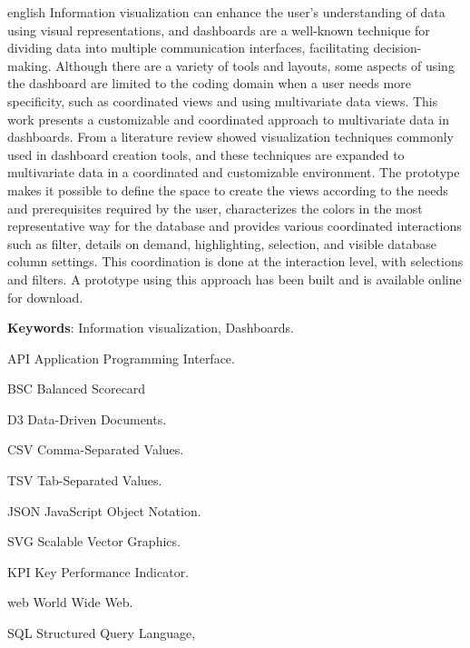 \documentclass[
	12pt,				%
	openright,			%
	oneside,			%
	a4paper,			%
	english,			%
	brazil				%
	]{abntex2}
\newcommand{\listofquadrosname}{Lista de quadros}
\begin{document}
\begin{resumo}[Abstract]
 \begin{otherlanguage*}{english}
   Information visualization can enhance the user's understanding of data using visual representations, and dashboards are a well-known technique for dividing data into multiple communication interfaces, facilitating decision-making. Although there are a variety of tools and layouts, some aspects of using the dashboard are limited to the coding domain when a user needs more specificity, such as coordinated views and using multivariate data views. This work presents a customizable and coordinated approach to multivariate data in dashboards. From a literature review showed visualization techniques commonly used in dashboard creation tools, and these techniques are expanded to multivariate data in a coordinated and customizable environment. The prototype makes it possible to define the space to create the views according to the needs and prerequisites required by the user, characterizes the colors in the most representative way for the database and provides various coordinated interactions such as filter, details on demand, highlighting, selection, and visible database column settings. This coordination is done at the interaction level, with selections and filters. A prototype using this approach has been built and is available online for download.
   \vspace{\onelineskip}
 
   \noindent 
   \textbf{Keywords}: Information visualization, Dashboards.
 \end{otherlanguage*}
\end{resumo}


\listoffigures*
\cleardoublepage

\pdfbookmark[0]{\listofquadrosname}{loq}
\cleardoublepage

\cleardoublepage

\begin{siglas}
  \item [API] Application Programming Interface.
  \item [BSC] Balanced Scorecard
  \item[D3]   Data-Driven Documents.
  \item[CSV]  Comma-Separated Values.
  \item[TSV]  Tab-Separated Values. 
  \item[JSON] JavaScript Object Notation.
  \item [SVG] Scalable Vector Graphics.
  \item [KPI] Key Performance Indicator.
  \item [web] World Wide Web.
  \item [SQL] Structured Query Language,
\end{siglas}
\end{document}
